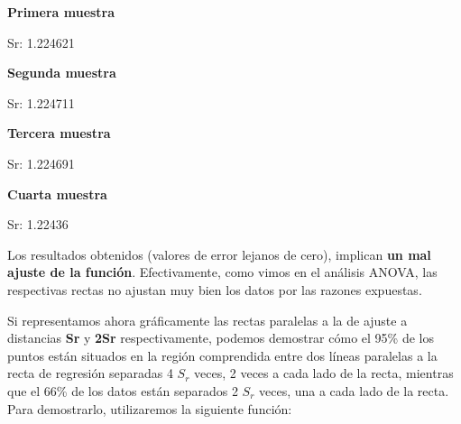 \documentclass [a4paper] {article}
\begin{document}
\textbf{Primera muestra}
\begin{Schunk}
\begin{Soutput}
Sr:  1.224621
\end{Soutput}
\end{Schunk}

\textbf{Segunda muestra}
\begin{Schunk}
\begin{Soutput}
Sr:  1.224711
\end{Soutput}
\end{Schunk}

\textbf{Tercera muestra}
\begin{Schunk}
\begin{Soutput}
Sr:  1.224691
\end{Soutput}
\end{Schunk}

\textbf{Cuarta muestra}
\begin{Schunk}
\begin{Soutput}
Sr:  1.22436
\end{Soutput}
\end{Schunk}

Los resultados obtenidos (valores de error lejanos de cero), implican \textbf{un mal ajuste de la función}.
Efectivamente, como vimos en el análisis ANOVA, las respectivas rectas no ajustan muy bien los datos por
las razones expuestas.

Si representamos ahora gráficamente las rectas paralelas a la de ajuste a distancias \textbf{Sr} y
\textbf{2Sr} respectivamente, podemos demostrar cómo el 95\% de los puntos están situados en la
región comprendida entre dos líneas paralelas a la recta de regresión separadas 4 $S_r$ veces,
2 veces a cada lado de la recta, mientras que el 66\% de los datos están separados 2 $S_r$ veces,
una a cada lado de la recta. Para demostrarlo, utilizaremos la siguiente función:
\begin{Schunk}
\end{Schunk}
\end{document}
